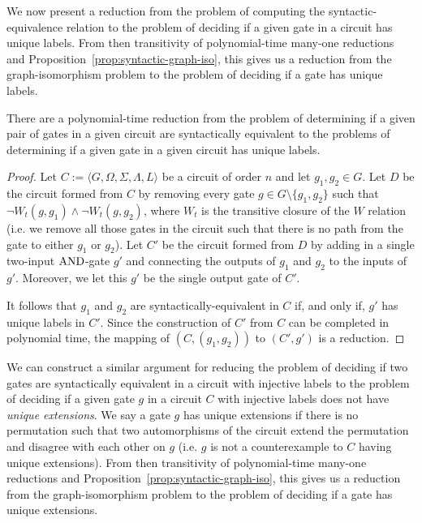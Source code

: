 \documentclass[../paper.tex]{subfiles}
\begin{document}
We now present a reduction from the problem of computing the
syntactic-equivalence relation to the problem of deciding if a given gate in a
circuit has unique labels. From then transitivity of polynomial-time many-one
reductions and Proposition~\ref{prop:syntactic-graph-iso}, this gives us a
reduction from the graph-isomorphism problem to the problem of deciding if a
gate has unique labels.

\begin{lem}
  There are a polynomial-time reduction from the problem of determining if a
  given pair of gates in a given circuit are syntactically equivalent to the
  problems of determining if a given gate in a given circuit has unique labels.
  \label{lem:syntactically-equivalent-unique-labels}
\end{lem}

\begin{proof}
  Let $C := \langle G, \Omega, \Sigma, \Lambda, L \rangle$ be a circuit of order
  $n$ and let $g_1, g_2 \in G$. Let $D$ be the circuit formed from $C$ by
  removing every gate $g \in G \setminus\{g_1, g_2\}$ such that $\neg W_t(g,
  g_1) \land \neg W_t(g, g_2)$, where $W_t$ is the transitive closure of the $W$
  relation (i.e. we remove all those gates in the circuit such that there is no
  path from the gate to either $g_1$ or $g_2$). Let $C'$ be the circuit formed
  from $D$ by adding in a single two-input $\text{\upshape AND}$-gate $g'$ and connecting the
  outputs of $g_1$ and $g_2$ to the inputs of $g'$. Moreover, we let this $g'$
  be the single output gate of $C'$.

  It follows that $g_1$ and $g_2$ are syntactically-equivalent in $C$ if, and
  only if, $g'$ has unique labels in $C'$. Since the construction of $C'$ from
  $C$ can be completed in polynomial time, the mapping of $(C, (g_1, g_2))$ to
  $(C', g')$ is a reduction.
\end{proof}

We can construct a similar argument for reducing the problem of deciding if two
gates are syntactically equivalent in a circuit with injective labels to the
problem of deciding if a given gate $g$ in a circuit $C$ with injective labels
does not have \emph{unique extensions}. We say a gate $g$ has unique extensions
if there is no permutation such that two automorphisms of the circuit extend the
permutation and disagree with each other on $g$ (i.e. $g$ is not a
counterexample to $C$ having unique extensions). From then transitivity of
polynomial-time many-one reductions and
Proposition~\ref{prop:syntactic-graph-iso}, this gives us a reduction from the
graph-isomorphism problem to the problem of deciding if a gate has unique
extensions.
\end{document}
